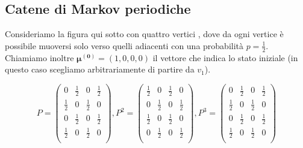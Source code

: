 \documentclass{article}
\theoremstyle{definition}
\theoremstyle{remark}
\begin{document}
\subsection{Catene di Markov periodiche}
Consideriamo la figura qui sotto con quattro vertici , dove da ogni vertice è
possibile muoversi solo verso quelli adiacenti con una probabilità  $p=\frac{1}{2}$. Chiamiamo inoltre $\boldsymbol{\mu^{(0)}} = (1,0,0,0)$ il vettore che indica 
lo stato iniziale (in questo caso scegliamo arbitrariamente di partire da $v_1$).
\begin{center}
    




    

\end{center}
$$ P =\begin{pmatrix}
    0 &\frac{1}{2} & 0 &\frac{1}{2}\\
    \frac{1}{2} & 0 &\frac{1}{2} & 0\\
    0 &\frac{1}{2} & 0 &\frac{1}{2}\\
    \frac{1}{2} & 0 &\frac{1}{2} & 0\\
\end{pmatrix},P^2 =\begin{pmatrix}
    \frac{1}{2} & 0 &\frac{1}{2} & 0\\
    0 &\frac{1}{2} & 0 &\frac{1}{2}\\
    \frac{1}{2} & 0 &\frac{1}{2} & 0\\
    0 &\frac{1}{2} & 0 &\frac{1}{2}\\
\end{pmatrix}, P^3 =\begin{pmatrix}
    0 &\frac{1}{2} & 0 &\frac{1}{2}\\
    \frac{1}{2} & 0 &\frac{1}{2} & 0\\
    0 &\frac{1}{2} & 0 &\frac{1}{2}\\
    \frac{1}{2} & 0 &\frac{1}{2} & 0\\
\end{pmatrix}$$
\end{document}
